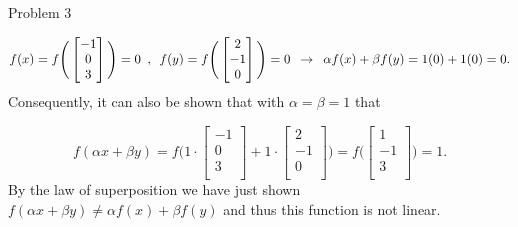 \begin{problem}{Problem 3}
\begin{highlight}
        \begin{equation}
            f(x) = f \Bigg(
                \begin{bmatrix}
                    -1 \\
                    0 \\ 
                    3 \\
                \end{bmatrix}
                \Bigg) = 0 \hspace*{5pt} , \hspace*{5pt}
            f(y) = f \Bigg(
                \begin{bmatrix}
                    2 \\
                    - 1 \\
                    0 \\
                \end{bmatrix}
                \Bigg) = 0 \hspace*{5pt} \rightarrow \hspace*{5pt} \alpha f(x) + \beta f(y) = 1(0) + 1(0) = 0.
        \end{equation}
        Consequently, it can also be shown that with $\alpha = \beta = 1$ that

        \begin{equation}
            f(\alpha x + \beta y) = f \Bigg(
                1 \cdot 
                \begin{bmatrix}
                    - 1 \\
                    0 \\
                    3 \\
                \end{bmatrix}
                + 1 \cdot 
                \begin{bmatrix}
                    2 \\
                    -1 \\
                    0 \\
                \end{bmatrix}
                \Bigg) = f \Bigg(
                \begin{bmatrix}
                    1 \\
                    -1 \\
                    3 \\
                \end{bmatrix}
                \Bigg ) = 1.
        \end{equation}
        By the law of superposition we have just shown $f(\alpha x + \beta y) \neq \alpha f(x) + \beta f(y)$ and thus this function is not linear.
    \end{highlight}


\end{problem}
